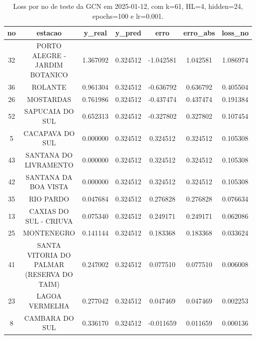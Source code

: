 \begin{table}[h]
\centering
\caption{Loss por no de teste da GCN em 2025-01-12, com k=61, HL=4, hidden=24, epochs=100 e lr=0.001.}
\label{tab:gcn_loss_k61_hl4_h24_e100_d20250112}
\begin{tabular}{ccccccc}
\toprule
no & estacao & y\_real & y\_pred & erro & erro\_abs & loss\_no \\
\midrule
32 & PORTO ALEGRE - JARDIM BOTANICO & 1.367092 & 0.324512 & -1.042581 & 1.042581 & 1.086974 \\
36 & ROLANTE & 0.961304 & 0.324512 & -0.636792 & 0.636792 & 0.405504 \\
26 & MOSTARDAS & 0.761986 & 0.324512 & -0.437474 & 0.437474 & 0.191384 \\
52 & SAPUCAIA DO SUL & 0.652313 & 0.324512 & -0.327802 & 0.327802 & 0.107454 \\
5 & CACAPAVA DO SUL & 0.000000 & 0.324512 & 0.324512 & 0.324512 & 0.105308 \\
43 & SANTANA DO LIVRAMENTO & 0.000000 & 0.324512 & 0.324512 & 0.324512 & 0.105308 \\
42 & SANTANA DA BOA VISTA & 0.000000 & 0.324512 & 0.324512 & 0.324512 & 0.105308 \\
35 & RIO PARDO & 0.047684 & 0.324512 & 0.276828 & 0.276828 & 0.076634 \\
13 & CAXIAS DO SUL - CRIUVA & 0.075340 & 0.324512 & 0.249171 & 0.249171 & 0.062086 \\
25 & MONTENEGRO & 0.141144 & 0.324512 & 0.183368 & 0.183368 & 0.033624 \\
41 & SANTA VITORIA DO PALMAR (RESERVA DO TAIM) & 0.247002 & 0.324512 & 0.077510 & 0.077510 & 0.006008 \\
23 & LAGOA VERMELHA & 0.277042 & 0.324512 & 0.047469 & 0.047469 & 0.002253 \\
8 & CAMBARA DO SUL & 0.336170 & 0.324512 & -0.011659 & 0.011659 & 0.000136 \\
\bottomrule
\end{tabular}
\end{table}
